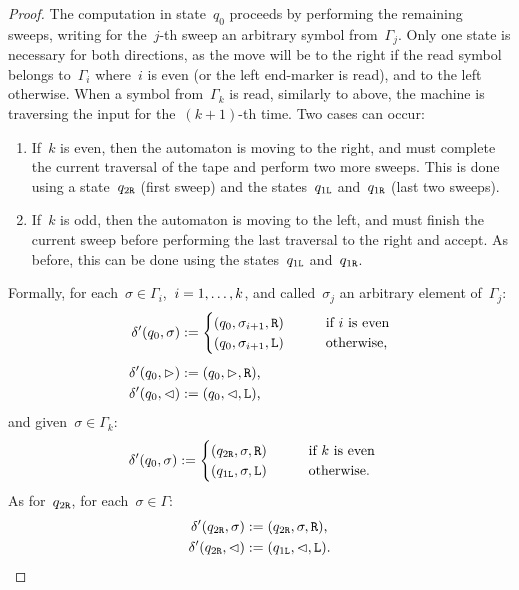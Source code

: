 \begin{proof}
	The computation in state~$q_0$ proceeds by performing the remaining sweeps, writing for the~$j$-th sweep an arbitrary symbol from~$\Gamma_j$.
	Only one state is necessary for both directions, as the move will be to the right if the read symbol belongs to~$\Gamma_i$ where~$i$ is even (or the left end-marker is read), and to the left otherwise.
	When a symbol from~$\Gamma_k$ is read, similarly to above, the machine is traversing the input for the~$(k+1)$-th time. Two cases can occur:
	\begin{enumerate}
		\item If~$k$ is even, then the automaton is moving to the right, and must complete the current traversal of the tape and perform two more sweeps. This is done using a state~$q_{2\mathtt{R}}$ (first sweep) and the states~$q_{1\mathtt{L}}$ and~$q_{1\mathtt{R}}$ (last two sweeps).
		\item If~$k$ is odd, then the automaton is moving to the left, and must finish the current sweep before performing the last traversal to the right and accept. As before, this can be done using the states~$q_{1\mathtt{L}}$ and~$q_{1\mathtt{R}}$.
	\end{enumerate}

	Formally, for each~$\sigma\in\Gamma_i$,~$i=1,\dots,k$, and called~$\sigma_j$ an arbitrary element of~$\Gamma_j$:
	\begin{align*}
		\delta'(q_0,\sigma) & := \begin{cases}
			                         (q_0,\sigma_{i+1},\mathtt R) \qquad & \text{if~$i$ is even}   \\
			                         (q_0,\sigma_{i+1},\mathtt L) \qquad & \text{otherwise} \text,
		                         \end{cases} \\[1ex]
		\delta'(q_0,\rhd)   & := (q_0,\rhd,\mathtt R) \text,                                   \\
		\delta'(q_0,\lhd)   & := (q_0,\lhd,\mathtt L) \text,
	\end{align*}
	and given~$\sigma\in\Gamma_k$:
	\begin{align*}
		\delta'(q_0,\sigma) & := \begin{cases}
			                         (q_{2\mathtt{R}},\sigma,\mathtt R) \qquad & \text{if~$k$ is even}   \\
			                         (q_{1\mathtt{L}},\sigma,\mathtt L) \qquad  & \text{otherwise} \text.
		                         \end{cases}
	\end{align*}
	As for~$q_{2\mathtt{R}}$, for each~$\sigma\in\Gamma$:
	\begin{align*}
		\delta'(q_{2\mathtt{R}},\sigma) & :=(q_{2\mathtt{R}},\sigma,\mathtt R) \text,       \\
		\delta'(q_{2\mathtt{R}},\lhd)   & :=(q_{1\mathtt{L}},\lhd,\mathtt L) \text. \qedhere
	\end{align*}
\end{proof}

